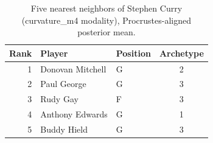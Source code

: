 \begin{table}[htbp]
  \centering\small
  \begin{tabular}{rllc}
    \toprule
    Rank & Player & Position & Archetype \\
    \midrule
    1 & Donovan Mitchell & G & 2 \\
    2 & Paul George & G & 3 \\
    3 & Rudy Gay & F & 3 \\
    4 & Anthony Edwards & G & 1 \\
    5 & Buddy Hield & G & 3 \\
    \bottomrule
  \end{tabular}
  \caption{Five nearest neighbors of Stephen Curry (curvature_m4 modality), Procrustes-aligned posterior mean.}
  \label{tab:Stephen_Curry_neighbors_curvature_m4}
\end{table}

